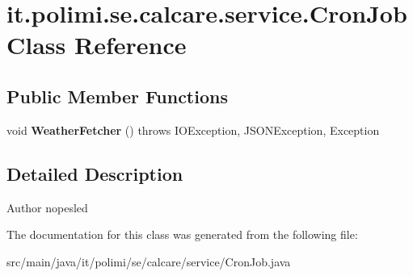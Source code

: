 \hypertarget{classit_1_1polimi_1_1se_1_1calcare_1_1service_1_1CronJob}{}\section{it.\+polimi.\+se.\+calcare.\+service.\+Cron\+Job Class Reference}
\label{classit_1_1polimi_1_1se_1_1calcare_1_1service_1_1CronJob}
\subsection*{Public Member Functions}
\begin{DoxyCompactItemize}
\item 
\hypertarget{classit_1_1polimi_1_1se_1_1calcare_1_1service_1_1CronJob_a22994d0fa211234bf11e8a0db5cd5bfe}{}void {\bfseries Weather\+Fetcher} ()  throws I\+O\+Exception, J\+S\+O\+N\+Exception, Exception \label{classit_1_1polimi_1_1se_1_1calcare_1_1service_1_1CronJob_a22994d0fa211234bf11e8a0db5cd5bfe}

\end{DoxyCompactItemize}


\subsection{Detailed Description}
\begin{DoxyAuthor}{Author}
nopesled 
\end{DoxyAuthor}


The documentation for this class was generated from the following file\+:\begin{DoxyCompactItemize}
\item 
src/main/java/it/polimi/se/calcare/service/Cron\+Job.\+java\end{DoxyCompactItemize}
